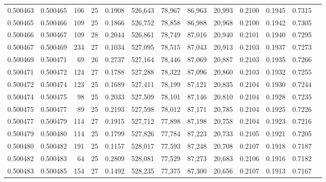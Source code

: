 \begin{tabular}{rrrrrrrrrrrrr}
0.500463 & 0.500465 & 106 &  25 &                                     0.1908 & 526,643 &  78,967 &  86,963 &  20,993 & 0.2100 & 0.1945 & 0.7315 \\
0.500465 & 0.500466 & 109 &  25 &                                     0.1866 & 526,752 &  78,858 &  86,988 &  20,968 & 0.2100 & 0.1942 & 0.7305 \\
0.500466 & 0.500467 & 109 &  28 &                                     0.2044 & 526,861 &  78,749 &  87,016 &  20,940 & 0.2101 & 0.1940 & 0.7295 \\
0.500467 & 0.500469 & 234 &  27 &                                     0.1034 & 527,095 &  78,515 &  87,043 &  20,913 & 0.2103 & 0.1937 & 0.7273 \\
0.500469 & 0.500471 &  69 &  26 &                                     0.2737 & 527,164 &  78,446 &  87,069 &  20,887 & 0.2103 & 0.1935 & 0.7266 \\
0.500471 & 0.500472 & 124 &  27 &                                     0.1788 & 527,288 &  78,322 &  87,096 &  20,860 & 0.2103 & 0.1932 & 0.7255 \\
0.500472 & 0.500474 & 123 &  25 &                                     0.1689 & 527,411 &  78,199 &  87,121 &  20,835 & 0.2104 & 0.1930 & 0.7244 \\
0.500474 & 0.500475 &  98 &  25 &                                     0.2033 & 527,509 &  78,101 &  87,146 &  20,810 & 0.2104 & 0.1928 & 0.7235 \\
0.500475 & 0.500477 &  89 &  25 &                                     0.2193 & 527,598 &  78,012 &  87,171 &  20,785 & 0.2104 & 0.1925 & 0.7226 \\
0.500477 & 0.500479 & 114 &  27 &                                     0.1915 & 527,712 &  77,898 &  87,198 &  20,758 & 0.2104 & 0.1923 & 0.7216 \\
0.500479 & 0.500480 & 114 &  25 &                                     0.1799 & 527,826 &  77,784 &  87,223 &  20,733 & 0.2105 & 0.1921 & 0.7205 \\
0.500480 & 0.500482 & 191 &  25 &                                     0.1157 & 528,017 &  77,593 &  87,248 &  20,708 & 0.2107 & 0.1918 & 0.7187 \\
0.500482 & 0.500483 &  64 &  25 &                                     0.2809 & 528,081 &  77,529 &  87,273 &  20,683 & 0.2106 & 0.1916 & 0.7182 \\
0.500483 & 0.500485 & 154 &  27 &                                     0.1492 & 528,235 &  77,375 &  87,300 &  20,656 & 0.2107 & 0.1913 & 0.7167 \\

\end{tabular}
